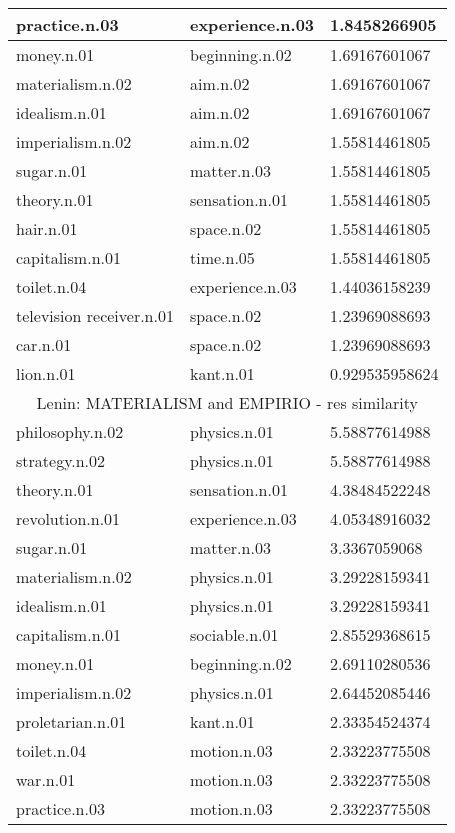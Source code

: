 \begin{center}
\begin{tabular}{ | l | l | l |}
practice.n.03 & experience.n.03 & 1.8458266905\\ \hline
money.n.01 & beginning.n.02 & 1.69167601067\\ \hline
materialism.n.02 & aim.n.02 & 1.69167601067\\ \hline
idealism.n.01 & aim.n.02 & 1.69167601067\\ \hline
imperialism.n.02 & aim.n.02 & 1.55814461805\\ \hline
sugar.n.01 & matter.n.03 & 1.55814461805\\ \hline
theory.n.01 & sensation.n.01 & 1.55814461805\\ \hline
hair.n.01 & space.n.02 & 1.55814461805\\ \hline
capitalism.n.01 & time.n.05 & 1.55814461805\\ \hline
toilet.n.04 & experience.n.03 & 1.44036158239\\ \hline
television receiver.n.01 & space.n.02 & 1.23969088693\\ \hline
car.n.01 & space.n.02 & 1.23969088693\\ \hline
lion.n.01 & kant.n.01 & 0.929535958624\\ \hline
\multicolumn{3}{|c|}{Lenin: MATERIALISM and EMPIRIO - res similarity} \\ \hline
philosophy.n.02 & physics.n.01 & 5.58877614988\\ \hline
strategy.n.02 & physics.n.01 & 5.58877614988\\ \hline
theory.n.01 & sensation.n.01 & 4.38484522248\\ \hline
revolution.n.01 & experience.n.03 & 4.05348916032\\ \hline
sugar.n.01 & matter.n.03 & 3.3367059068\\ \hline
materialism.n.02 & physics.n.01 & 3.29228159341\\ \hline
idealism.n.01 & physics.n.01 & 3.29228159341\\ \hline
capitalism.n.01 & sociable.n.01 & 2.85529368615\\ \hline
money.n.01 & beginning.n.02 & 2.69110280536\\ \hline
imperialism.n.02 & physics.n.01 & 2.64452085446\\ \hline
proletarian.n.01 & kant.n.01 & 2.33354524374\\ \hline
toilet.n.04 & motion.n.03 & 2.33223775508\\ \hline
war.n.01 & motion.n.03 & 2.33223775508\\ \hline
practice.n.03 & motion.n.03 & 2.33223775508\\ \hline

\end{tabular}
\end{center}
